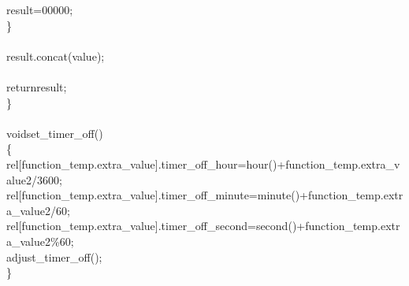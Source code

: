 \documentclass[a4paper, 12pt]{article}
\newcommand\SPC{\hspace*{0.6em}}
\newcommand\QOT{\mbox{\char 34}}
\newcommand{\CppAIdentifier}[1]{\textcolor[rgb]{0,1,0}{#1}}
\newcommand{\CppANumber}[1]{\textcolor[rgb]{0,0,1}{#1}}
\newcommand{\CppAReservedWord}[1]{\textcolor[rgb]{0,0.5,0}{#1}}
\newcommand{\CppASpace}[1]{\textcolor[rgb]{1,1,1}{\colorbox[rgb]{0,0,0}{#1}}}
\newcommand{\CppAString}[1]{\textcolor[rgb]{0.76,0.76,0.76}{#1}}
\newcommand{\CppASymbol}[1]{\textcolor[rgb]{1,0,0}{#1}}
\begin{document}
\begin{ttfamily}
\CppASpace{\SPC \SPC \SPC \SPC }\CppAIdentifier{result}\CppASymbol{=}\CppAString{\QOT 00000\QOT }\CppASymbol{;}\\
\CppASpace{\SPC \SPC }\CppASymbol{\}}\\
\\
\CppASpace{\SPC \SPC }\CppAIdentifier{result}\CppASymbol{.}\CppAIdentifier{concat}\CppASymbol{(}\CppAIdentifier{value}\CppASymbol{)}\CppASymbol{;}\\
\\
\CppASpace{\SPC \SPC }\CppAReservedWord{return}\CppASpace{\SPC }\CppAIdentifier{result}\CppASymbol{;}\\
\CppASymbol{\}}\\
\\
\CppAReservedWord{void}\CppASpace{\SPC }\CppAIdentifier{set\_timer\_off}\CppASymbol{(}\CppASymbol{)}\\
\CppASymbol{\{}\\
\CppASpace{\SPC \SPC }\CppAIdentifier{rel}\CppASymbol{[}\CppAIdentifier{function\_temp}\CppASymbol{.}\CppAIdentifier{extra\_value}\CppASymbol{]}\CppASymbol{.}\CppAIdentifier{timer\_off\_hour}\CppASpace{\SPC }\CppASymbol{=}\CppASpace{\SPC }\CppAIdentifier{hour}\CppASymbol{(}\CppASymbol{)}\CppASymbol{+}\CppAIdentifier{function\_temp}\CppASymbol{.}\CppAIdentifier{extra\_value2}\CppASymbol{/}\CppANumber{3600}\CppASymbol{;}\\
\CppASpace{\SPC \SPC }\CppAIdentifier{rel}\CppASymbol{[}\CppAIdentifier{function\_temp}\CppASymbol{.}\CppAIdentifier{extra\_value}\CppASymbol{]}\CppASymbol{.}\CppAIdentifier{timer\_off\_minute}\CppASpace{\SPC }\CppASymbol{=}\CppASpace{\SPC }\CppAIdentifier{minute}\CppASymbol{(}\CppASymbol{)}\CppASymbol{+}\CppAIdentifier{function\_temp}\CppASymbol{.}\CppAIdentifier{extra\_value2}\CppASymbol{/}\CppANumber{60}\CppASymbol{;}\\
\CppASpace{\SPC \SPC }\CppAIdentifier{rel}\CppASymbol{[}\CppAIdentifier{function\_temp}\CppASymbol{.}\CppAIdentifier{extra\_value}\CppASymbol{]}\CppASymbol{.}\CppAIdentifier{timer\_off\_second}\CppASpace{\SPC }\CppASymbol{=}\CppASpace{\SPC }\CppAIdentifier{second}\CppASymbol{(}\CppASymbol{)}\CppASymbol{+}\CppAIdentifier{function\_temp}\CppASymbol{.}\CppAIdentifier{extra\_value2}\CppASymbol{\%}\CppANumber{60}\CppASymbol{;}\\
\CppASpace{\SPC \SPC }\CppAIdentifier{adjust\_timer\_off}\CppASymbol{(}\CppASymbol{)}\CppASymbol{;}\CppASpace{\SPC }\\
\CppASymbol{\}}\\
\\

\end{ttfamily}
\end{document}
